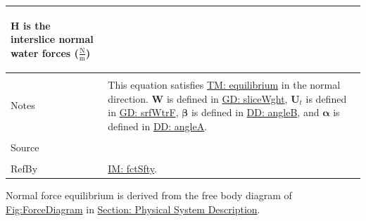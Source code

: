 \documentclass[12pt]{article}
\begin{document}
\begin{minipage}{\textwidth}
\begin{tabular}{p{} p{}}
\begin{symbDescription}
              \item{$\mathbf{H}$ is the interslice normal water forces ($\frac{\text{N}}{\text{m}}$)}
              \end{symbDescription}
\\ \midrule \\
Notes & This equation satisfies \hyperref[TM:equilibrium]{TM: equilibrium} in the normal direction. $\mathbf{W}$ is defined in \hyperref[GD:sliceWght]{GD: sliceWght}, ${\mathbf{U}_{t}}$ is defined in \hyperref[GD:srfWtrF]{GD: srfWtrF}, $\mathbf{β}$ is defined in \hyperref[DD:angleB]{DD: angleB}, and $\mathbf{α}$ is defined in \hyperref[DD:angleA]{DD: angleA}.
\\ \midrule \\
Source & \cite{chen2005}
\\ \midrule \\
RefBy & \hyperref[IM:fctSfty]{IM: fctSfty}.
\\ \bottomrule \end{tabular}
\end{minipage}
Normal force equilibrium is derived from the free body diagram of \hyperref[Figure:ForceDiagram]{Fig:ForceDiagram} in \hyperref[Sec:PhysSyst]{Section: Physical System Description}.
\par~
\end{document}
